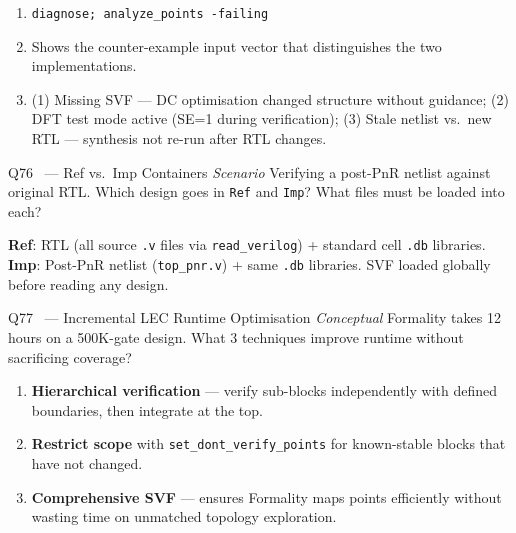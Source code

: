 \documentclass[12pt,a4paper]{article}
\newcommand{\advanced}{%
  \fbox{\textcolor{advred}{\bfseries\sffamily\small ADVANCED}}}
\newcommand{\moderate}{%
  \fbox{\textcolor{modoran}{\bfseries\sffamily\small MODERATE}}}
\begin{document}
\begin{answerbox}
\begin{enumerate}[label=\textbf{\alph*)}]
  \item \texttt{diagnose; analyze\_points -failing}
  \item Shows the counter-example input vector that distinguishes the two implementations.
  \item (1) Missing SVF --- DC optimisation changed structure without guidance; (2) DFT test mode active (SE=1 during verification); (3) Stale netlist vs.\ new RTL --- synthesis not re-run after RTL changes.
\end{enumerate}
\end{answerbox}

\begin{questionbox}{Q76 \moderate\ --- Ref vs.\ Imp Containers \hfill\textit{Scenario}}
Verifying a post-PnR netlist against original RTL. Which design goes in \texttt{Ref} and \texttt{Imp}? What files must be loaded into each?
\end{questionbox}

\begin{answerbox}
\textbf{Ref}: RTL (all source \texttt{.v} files via \texttt{read\_verilog}) + standard cell \texttt{.db} libraries.\\
\textbf{Imp}: Post-PnR netlist (\texttt{top\_pnr.v}) + same \texttt{.db} libraries. SVF loaded globally before reading any design.
\end{answerbox}

\begin{questionbox}{Q77 \advanced\ --- Incremental LEC Runtime Optimisation \hfill\textit{Conceptual}}
Formality takes 12 hours on a 500K-gate design. What 3 techniques improve runtime without sacrificing coverage?
\end{questionbox}

\begin{answerbox}
\begin{enumerate}
  \item \textbf{Hierarchical verification} --- verify sub-blocks independently with defined boundaries, then integrate at the top.
  \item \textbf{Restrict scope} with \texttt{set\_dont\_verify\_points} for known-stable blocks that have not changed.
  \item \textbf{Comprehensive SVF} --- ensures Formality maps points efficiently without wasting time on unmatched topology exploration.
\end{enumerate}
\end{answerbox}
\end{document}

